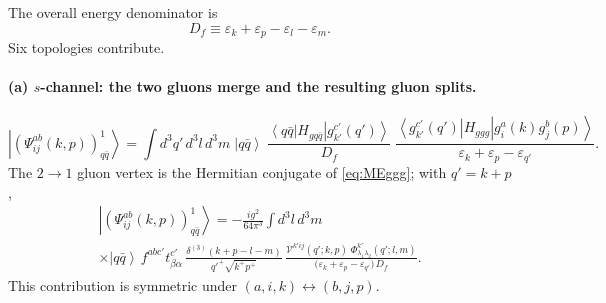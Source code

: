 \documentclass[11pt,a4paper]{article}
\numberwithin{equation}{section}
\newcommand{\eps}{\varepsilon}
\newcommand{\dthree}{\delta^{(3)}}
\newcommand{\ket}[1]{\left|#1\right\rangle}
\newcommand{\bra}[1]{\left\langle#1\right|}
\newcommand{\Ph}{\Phi}
\newcommand{\Vg}{\mathcal{V}}
\newcommand{\qk}[3]{q^{#1}_{#2}(#3)}
\newcommand{\aqk}[3]{\bar q^{#1}_{#2}(#3)}
\newcommand{\gl}[3]{g^{#1}_{#2}(#3)}
\begin{document}
The overall energy denominator is
\begin{equation}
D_{f}\equiv\eps_{k}+\eps_{p}-\eps_{l}-\eps_{m}.
\end{equation}
Six topologies contribute.

\paragraph{(a) $s$-channel: the two gluons merge and the resulting gluon splits.}
\begin{center}
\end{center}
\begin{equation}
\ket{(\Psi^{ab}_{ij}(k,p))^{1}_{q\bar q}}=\int\! d^{3}q'\,d^{3}l\,d^{3}m\;
\ket{q\bar q}\;
\frac{\bra{q\bar q}H_{gq\bar q}\ket{\gl{c'}{k'}{q'}}}{D_{f}}\;
\frac{\bra{\gl{c'}{k'}{q'}}H_{ggg}\ket{\gl{a}{i}{k}\gl{b}{j}{p}}}{\eps_{k}+\eps_{p}-\eps_{q'}} .
\end{equation}
The $2\to1$ gluon vertex is the Hermitian conjugate of \eqref{eq:MEggg}; with $q'=k+p$,
\begin{multline}
\ket{(\Psi^{ab}_{ij}(k,p))^{1}_{q\bar q}}=-\frac{ig^{2}}{64\pi^{3}}\int\!d^{3}l\,d^{3}m\;
\\
\times\ket{q\bar q}\,f^{abc'}t^{c'}_{\beta\alpha}\,
\frac{\dthree(k+p-l-m)}{q'^{+}\sqrt{k^{+}p^{+}}}\,
\frac{\Vg^{k'ij}(q';k,p)\;\Ph^{k'}_{\lambda_{1}\lambda_{2}}(q';l,m)}
{\big(\eps_{k}+\eps_{p}-\eps_{q'}\big)\,D_{f}} .
\label{eq:B1a}
\end{multline}
This contribution is symmetric under $(a,i,k)\leftrightarrow(b,j,p)$.
\end{document}
